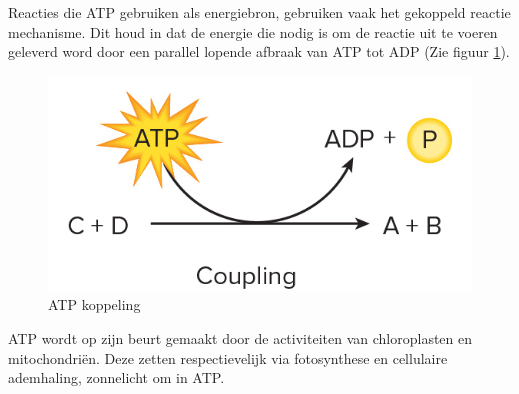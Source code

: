 \documentclass[a4paper,kul]{kulakarticle} %
\begin{document}
Reacties die ATP gebruiken als energiebron, gebruiken vaak het gekoppeld reactie mechanisme. Dit houd in dat de energie die nodig is om de reactie uit te voeren geleverd word door een parallel lopende afbraak van ATP tot ADP (Zie figuur \ref{fig:atpcoupeling}). 
\begin{figure}[h]
	\centering
	\includegraphics[width=0.7\linewidth]{ATPCoupeling}
	\caption[ATP Koppeling]{ATP koppeling}
	\label{fig:atpcoupeling}
\end{figure}
ATP wordt op zijn beurt gemaakt door de activiteiten van chloroplasten en mitochondriën. Deze zetten respectievelijk via fotosynthese en cellulaire ademhaling, zonnelicht om in ATP. 
\end{document}
